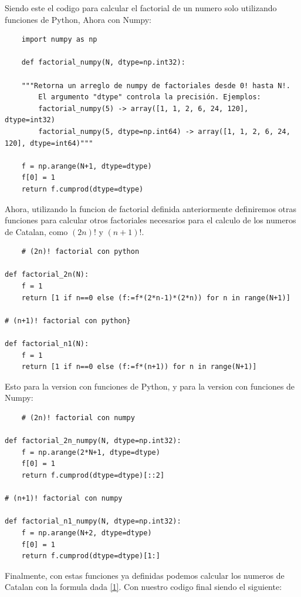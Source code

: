\documentclass[../portafolio.tex]{subfiles}
\begin{document}
Siendo este el codigo para calcular el factorial de un numero solo utilizando funciones de Python, Ahora con 
Numpy:

\begin{lstlisting}
    import numpy as np

    def factorial_numpy(N, dtype=np.int32):

    """Retorna un arreglo de numpy de factoriales desde 0! hasta N!.
        El argumento "dtype" controla la precisión. Ejemplos:
        factorial_numpy(5) -> array([1, 1, 2, 6, 24, 120], dtype=int32)
        factorial_numpy(5, dtype=np.int64) -> array([1, 1, 2, 6, 24, 120], dtype=int64)"""
    
    f = np.arange(N+1, dtype=dtype)
    f[0] = 1
    return f.cumprod(dtype=dtype)
\end{lstlisting}

Ahora, utilizando la funcion de factorial definida anteriormente definiremos otras funciones para calcular
otros factoriales necesarios para el calculo de los numeros de Catalan, como $(2n)!$ y $(n+1)!$.

\begin{lstlisting}
    # (2n)! factorial con python

def factorial_2n(N):
    f = 1
    return [1 if n==0 else (f:=f*(2*n-1)*(2*n)) for n in range(N+1)]

# (n+1)! factorial con python}

def factorial_n1(N):
    f = 1
    return [1 if n==0 else (f:=f*(n+1)) for n in range(N+1)]
\end{lstlisting}

Esto para la version con funciones de Python, y para la version con funciones de Numpy:

\begin{lstlisting}
    # (2n)! factorial con numpy

def factorial_2n_numpy(N, dtype=np.int32):
    f = np.arange(2*N+1, dtype=dtype)
    f[0] = 1
    return f.cumprod(dtype=dtype)[::2]

# (n+1)! factorial con numpy

def factorial_n1_numpy(N, dtype=np.int32):
    f = np.arange(N+2, dtype=dtype)
    f[0] = 1
    return f.cumprod(dtype=dtype)[1:]
\end{lstlisting}

Finalmente, con estas funciones ya definidas podemos calcular los numeros de Catalan con la formula dada \eqref{1}.
Con nuestro codigo final siendo el siguiente:
\end{document}

